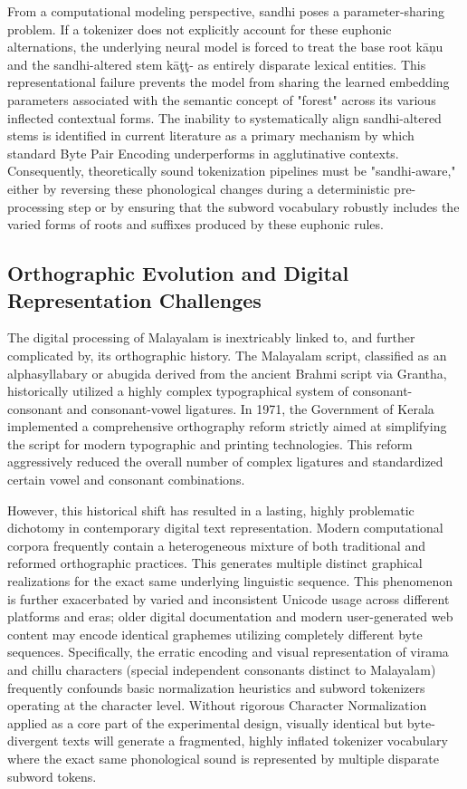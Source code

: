 \documentclass[12pt]{article}
\begin{document}
	From a computational modeling perspective, sandhi poses a parameter-sharing problem. If a tokenizer does not explicitly account for these euphonic alternations, the underlying neural model is forced to treat the base root kāņu and the sandhi-altered stem kāţţ- as entirely disparate lexical entities.\cite{} This representational failure prevents the model from sharing the learned embedding parameters associated with the semantic concept of "forest" across its various inflected contextual forms. The inability to systematically align sandhi-altered stems is identified in current literature as a primary mechanism by which standard Byte Pair Encoding underperforms in agglutinative contexts. Consequently, theoretically sound tokenization pipelines must be "sandhi-aware," either by reversing these phonological changes during a deterministic pre-processing step or by ensuring that the subword vocabulary robustly includes the varied forms of roots and suffixes produced by these euphonic rules. \cite{}
	
	\subsection{Orthographic Evolution and Digital Representation Challenges }
	
	The digital processing of Malayalam is inextricably linked to, and further complicated by, its orthographic history. The Malayalam script, classified as an alphasyllabary or abugida derived from the ancient Brahmi script via Grantha, historically utilized a highly complex typographical system of consonant-consonant and consonant-vowel ligatures. In 1971, the Government of Kerala implemented a comprehensive orthography reform strictly aimed at simplifying the script for modern typographic and printing technologies.\cite{} This reform aggressively reduced the overall number of complex ligatures and standardized certain vowel and consonant combinations. 
	
	However, this historical shift has resulted in a lasting, highly problematic dichotomy in contemporary digital text representation. Modern computational corpora frequently contain a heterogeneous mixture of both traditional and reformed orthographic practices. This generates multiple distinct graphical realizations for the exact same underlying linguistic sequence. This phenomenon is further exacerbated by varied and inconsistent Unicode usage across different platforms and eras; older digital documentation and modern user-generated web content may encode identical graphemes utilizing completely different byte sequences. Specifically, the erratic encoding and visual representation of virama and chillu characters (special independent consonants distinct to Malayalam) frequently confounds basic normalization heuristics and subword tokenizers operating at the character level. Without rigorous Character Normalization applied as a core part of the experimental design, visually identical but byte-divergent texts will generate a fragmented, highly inflated tokenizer vocabulary where the exact same phonological sound is represented by multiple disparate subword tokens. \cite{}\cite{}
	
\end{document}
